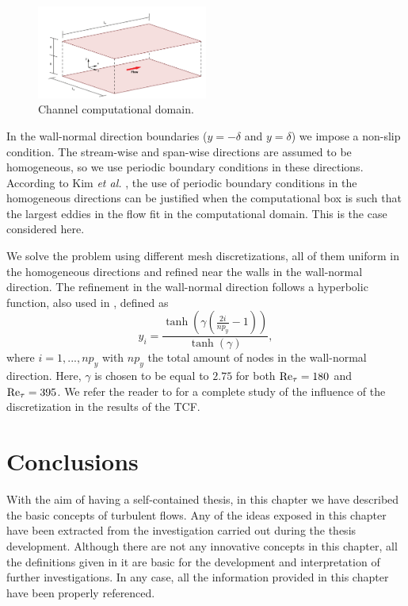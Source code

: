 \begin{figure}[h!]
	\centering	
	\includegraphics[width=0.5\textwidth]{Figures/Chapter3/channel_geom}
	\caption{Channel computational domain.}
	\label{fig:Channel_geo}
\end{figure}

In the wall-normal direction boundaries ($y=-\delta$ and $y=\delta$) we impose a non-slip condition. The stream-wise and span-wise directions are assumed to be homogeneous, so we use periodic boundary conditions in these directions. According to Kim  \emph{et al.} \cite{kim_turbulence_1987}, the use of periodic boundary conditions in the homogeneous directions can be justified when the computational box is such that the largest eddies in the flow fit in the computational domain. This is the case considered here.

We solve the problem using different mesh discretizations, all of them uniform in the homogeneous directions and refined near the walls in the wall-normal direction. The refinement in the wall-normal direction follows a hyperbolic function, also used in \cite{calderer_residual-based_2013,  gamnitzer_time-dependent_2010,  gravemeier_algebraic_2010, gullbrand_effect_2003, masud_variational_2011}, defined as 
$$y_i=\frac{\tanh\left(\gamma\left(\frac{2i}{np_y}-1\right)\right)}{\tanh(\gamma)},$$
where $i=1,...,np_y$ with $np_y$ the total amount of nodes in the wall-normal direction. Here, $\gamma$ is  chosen to be equal to $2.75$ for both  ${\rm Re}_\tau=180$ and ${\rm Re}_\tau=395$.  We refer the reader to \cite{avila_large_2014} for a complete study of the influence of the discretization in the results of the TCF.

\section{Conclusions}
\label{sec-C3_conclusions}
With the aim of having a self-contained thesis, in this chapter we have described the basic concepts of turbulent flows. Any of the ideas exposed in this chapter have been extracted from the investigation carried out during the thesis development. Although there are not any innovative concepts in this chapter, all the definitions given in it are basic for the development and interpretation of further investigations. In any case, all the information provided in this chapter have been properly referenced.

